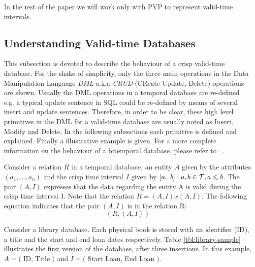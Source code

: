 In the rest of the paper we will work only with PVP to represent valid-time intervals.


\subsection{\label{subsubsec:Understanding-valid-time-databases}Understanding Valid-time Databases}
This subsection is devoted to describe the behaviour of a crisp valid-time database. For the shake of simplicity, only the three main operations in the Data Manipulation Language \emph{DML} a.k.a \emph{CRUD} (CReate Update, Delete) operations are shown. Usually the DML operations in a temporal database are re-defined e.g. a typical update sentence in SQL could be re-defined by means of several insert and update sentences. Therefore, in order to be clear, these high level primitives in the DML for a valid-time database are usually noted as Insert, Modify and Delete. In the following subsections each primitive is defined and explained. Finally a illustrative example is given. For a more complete information on the behaviour of a bitemporal database, please refer to ~\cite{Jensen1994}.

\begin{definition}
Consider a relation $R$ in a temporal database, an entity $A$ given by the attributes $\left(a_1, \ldots, a_n \right)$ and the crisp time interval $I$ given by $\left[a,\ b\right] : a,b \in \mathcal{T}, a \leqslant b$. The pair $\left(A, I\right)$ expresses that the data regarding the entity A is valid during the crisp time interval I.  Note that the relation $R = \left(A, I \right) x \left(A, I \right)$. The following equation indicates that the pair $\left(A, I\right)$ is in the relation R:
\begin{equation}
\label{eq:rel-def}
\left( R, \left(A , I\right) \right)
\end{equation}
\end{definition}
\begin{example}
 Consider a library database. Each physical book is stored with an identifier (ID), a title and the start and end loan dates respectively. Table \ref{tbl:library-sample} illustrates the first version of the database, after three insertions. In this example, $A = ($ ID, Title $)$ and $I = ($ Start Loan, End Loan $)$.
\end{example}





